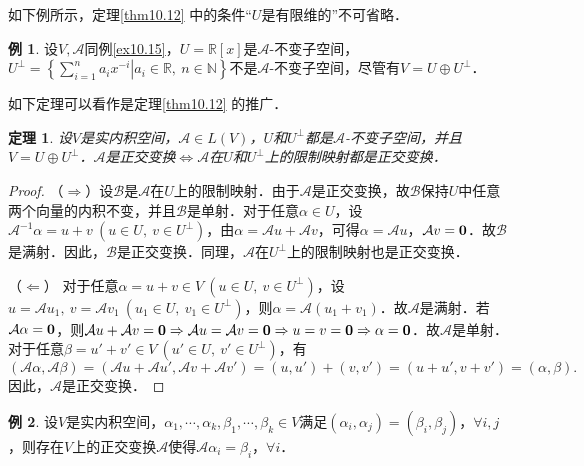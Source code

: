 \documentclass[a4paper,fontset=windows]{ctexbook}
\newtheorem{theorem}{定理}[chapter]
\theoremstyle{definition}
\newtheorem{example}{例}[chapter]
\def\note{\noindent\raisebox{10pt}{\dbend}\hspace{7pt}}
\begin{document}
\note 如下例所示，定理\ref{thm10.12} 中的条件“$U$是有限维的”不可省略．

\begin{example}\label{ex10.16}
设$V,\mathcal{A}$同例\ref{ex10.15}，$U=\mathbb{R}[x]$是$\mathcal{A}$-不变子空间，$U^\perp=\left\{\left.\sum\limits_{i=1}^na_ix^{-i}\right|a_i\in\mathbb{R},~n\in\mathbb{N}\right\}$不是$\mathcal{A}$-不变子空间，尽管有$V=U\oplus U^\perp$．
\end{example}

如下定理可以看作是定理\ref{thm10.12} 的推广．

\begin{theorem}\label{thm10.13}
设$V$是实内积空间，$\mathcal{A}\in L(V)$，$U$和$U^\perp$都是$\mathcal{A}$-不变子空间，并且$V=U\oplus U^\perp$．$\mathcal{A}$是正交变换$\Leftrightarrow\mathcal{A}$在$U$和$U^\perp$上的限制映射都是正交变换．
\end{theorem}

\begin{proof}
（$\Rightarrow$）设$\mathcal{B}$是$\mathcal{A}$在$U$上的限制映射．由于$\mathcal{A}$是正交变换，故$\mathcal{B}$保持$U$中任意两个向量的内积不变，并且$\mathcal{B}$是单射．对于任意$\alpha\in U$，设$\mathcal{A}^{-1}\alpha=u+v~(u\in U,~v\in U^\perp)$，由$\alpha=\mathcal{A}u+\mathcal{A}v$，可得$\alpha=\mathcal{A}u$，$\mathcal{A}v={\bf 0}$．故$\mathcal{B}$是满射．因此，$\mathcal{B}$是正交变换．同理，$\mathcal{A}$在$U^\perp$上的限制映射也是正交变换．

（$\Leftarrow$） 对于任意$\alpha=u+v\in V~(u\in U,~v\in U^\perp)$，设$u=\mathcal{A}u_1,~v=\mathcal{A}v_1~(u_1\in U,~v_1\in U^\perp)$，则$\alpha=\mathcal{A}(u_1+v_1)$．故$\mathcal{A}$是满射．若$\mathcal{A}\alpha={\bf 0}$，则$\mathcal{A}u+\mathcal{A}v={\bf 0}\Rightarrow\mathcal{A}u=\mathcal{A}v={\bf 0}\Rightarrow u=v={\bf 0}\Rightarrow\alpha={\bf 0}$．故$\mathcal{A}$是单射．对于任意$\beta=u'+v'\in V~(u'\in U,~v'\in U^\perp)$，有
$$(\mathcal{A}\alpha,\mathcal{A}\beta)=(\mathcal{A}u+\mathcal{A}u',\mathcal{A}v+\mathcal{A}v')=(u,u')+(v,v')=(u+u',v+v')=(\alpha,\beta).$$
因此，$\mathcal{A}$是正交变换．
\end{proof}

\begin{example}\label{ex10.17}
设$V$是实内积空间，$\alpha_1,\cdots,\alpha_k,\beta_1,\cdots,\beta_k\in V$满足$(\alpha_i,\alpha_j)=(\beta_i,\beta_j)$，$\forall i,j$，则存在$V$上的正交变换$\mathcal{A}$使得$\mathcal{A}\alpha_i=\beta_i$，$\forall i$．
\end{example}
\end{document}

